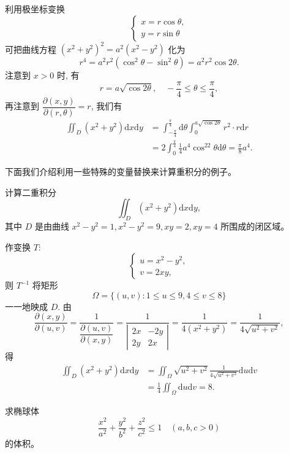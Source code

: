 \documentclass[12pt,fontset=fandol]{ctexart}
\begin{document}
\begin{solve}\quad 利用极坐标变换
\[
  \begin{cases}
    x=r\cos\theta,\\
    y=r\sin\theta
  \end{cases}
\]
可把曲线方程 $(x^2+y^2)^2=a^2(x^2-y^2)$ 化为
\[
  r^4=a^2r^2(\cos^2\theta-\sin^2\theta)=a^2r^2\cos2\theta.
\]
注意到 $x>0$ 时, 有
\[
  r=a\sqrt{\cos2\theta},\quad -\frac\pi4\leqslant\theta\leqslant\frac\pi4,
\]
再注意到 $\dfrac{\partial(x,y)}{\partial(r,\theta)}=r$, 我们有
\[
\begin{aligned}
  \iint_D(x^2+y^2)\mathrm dx\mathrm dy
  &=\int_{-\frac\pi4}^{\frac\pi4}\mathrm d\theta
  \int_0^{a\sqrt{\cos2\theta}}r^2\cdot r\mathrm dr\\
  &=2\int_0^{\frac\pi4}\frac14a^4\cos^22\theta\mathrm d\theta
  =\frac\pi8a^4.
\end{aligned}
\]

下面我们介绍利用一些特殊的变量替换来计算重积分的例子。

\end{solve}
\begin{example}\label{course-example-15-4-3}\quad 计算二重积分
\[
  \iint_D(x^2+y^2)\mathrm dx\mathrm dy,
\]
其中 $D$ 是由曲线 $x^2-y^2=1,x^2-y^2=9,xy=2,xy=4$ 所围成的闭区域。

\end{example}
\begin{solve}\quad 作变换 $T$:
\[
  \begin{cases}
    u=x^2-y^2,\\
    v=2xy,
  \end{cases}
\]
则 $T^{-1}$ 将矩形
\[
  \Omega=\{(u,v):1\leqslant u\leqslant9,4\leqslant v\leqslant8\}
  \]
一一地映成 $D$. 由
\[
  \frac{\partial(x,y)}{\partial(u,v)}
  =\frac1{\dfrac{\partial(u,v)}{\partial(x,y)}}
  =\frac1{\left|\begin{matrix}2x&-2y\\2y&2x\end{matrix}\right|}
  =\frac1{4(x^2+y^2)}
  =\frac1{4\sqrt{u^2+v^2}},
\]
得
\[
\begin{aligned}
  \iint_D(x^2+y^2)\mathrm dx\mathrm dy
  &=\iint_\Omega\sqrt{u^2+v^2}\frac1{4\sqrt{u^2+v^2}}\mathrm du\mathrm dv\\
  &=\frac14\iint_\Omega\mathrm du\mathrm dv=8.
\end{aligned}
\]

\end{solve}
\begin{example}\label{course-example-15-4-4}\quad 求椭球体
\[
  \frac{x^2}{a^2}+\frac{y^2}{b^2}+\frac{z^2}{c^2}\leqslant1\quad(a,b,c>0)
\]
的体积。

\end{example}
\end{document}
